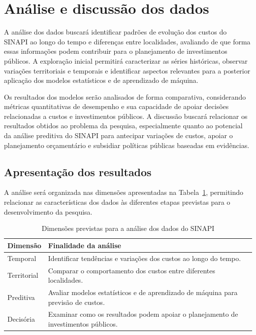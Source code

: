 
\section{Análise e discussão dos dados}

A análise dos dados buscará identificar padrões de evolução dos custos do SINAPI 
ao longo do tempo e diferenças entre localidades, avaliando de que forma essas 
informações podem contribuir para o planejamento de investimentos públicos. 
A exploração inicial permitirá caracterizar as séries históricas, 
observar variações territoriais e temporais e identificar aspectos relevantes para a 
posterior aplicação dos modelos estatísticos e de aprendizado de máquina. 

Os resultados dos modelos serão analisados de forma comparativa, considerando métricas quantitativas de 
desempenho e sua capacidade de apoiar decisões relacionadas a custos e investimentos públicos. 
A discussão buscará relacionar os resultados obtidos ao problema da pesquisa, 
especialmente quanto ao potencial da análise preditiva do SINAPI para antecipar 
variações de custos, apoiar o planejamento orçamentário e subsidiar políticas públicas 
baseadas em evidências.

\subsection{Apresentação dos resultados}

A análise será organizada nas dimensões apresentadas na 
Tabela~\ref{tab:dimensoes-analise-sinapi}, permitindo relacionar as características 
dos dados às diferentes etapas previstas para o desenvolvimento da pesquisa.

\begin{table}[htb] 
    \centering 
    \caption{Dimensões previstas para a análise dos dados do SINAPI} 
    \label{tab:dimensoes-analise-sinapi}
     \begin{tabular}{p{} p{}}
         \hline
          \textbf{Dimensão} & \textbf{Finalidade da análise} \\
           \hline
            Temporal & Identificar tendências e variações dos custos ao longo do tempo.\\
            Territorial & Comparar o comportamento dos custos entre diferentes localidades.\\
            Preditiva & Avaliar modelos estatísticos e de aprendizado de máquina para previsão de custos. \\
            Decisória & Examinar como os resultados podem apoiar o planejamento de investimentos públicos. \\
             \hline
             \end{tabular}
             \end{table}

